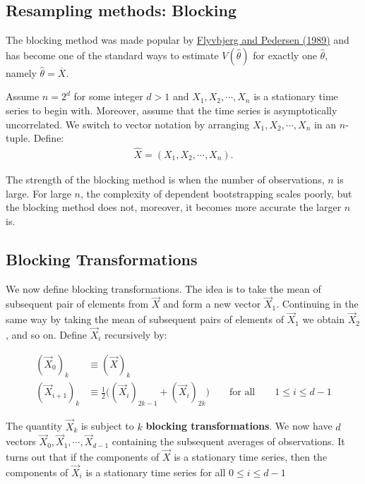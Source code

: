 \documentclass[%
oneside,                 %
final,                   %
10pt]{article}
\begin{document}
\subsection*{Resampling methods: Blocking}

The blocking method was made popular by \href{{https://aip.scitation.org/doi/10.1063/1.457480}}{Flyvbjerg and Pedersen (1989)}
and has become one of the standard ways to estimate
$V(\widehat{\theta})$ for exactly one $\widehat{\theta}$, namely
$\widehat{\theta} = \overline{X}$. 

Assume $n = 2^d$ for some integer $d>1$ and $X_1,X_2,\cdots, X_n$ is a stationary time series to begin with. 
Moreover, assume that the time series is asymptotically uncorrelated. We switch to vector notation by arranging $X_1,X_2,\cdots,X_n$ in an $n$-tuple. Define:
\begin{align*}
\hat{X} = (X_1,X_2,\cdots,X_n).
\end{align*}

The strength of the blocking method is when the number of
observations, $n$ is large. For large $n$, the complexity of dependent
bootstrapping scales poorly, but the blocking method does not,
moreover, it becomes more accurate the larger $n$ is.

\subsection*{Blocking Transformations}
 We now define
blocking transformations. The idea is to take the mean of subsequent
pair of elements from $\vec{X}$ and form a new vector
$\vec{X}_1$. Continuing in the same way by taking the mean of
subsequent pairs of elements of $\vec{X}_1$ we obtain $\vec{X}_2$, and
so on. 
Define $\vec{X}_i$ recursively by:

\begin{align} 
(\vec{X}_0)_k &\equiv (\vec{X})_k \nonumber \\
(\vec{X}_{i+1})_k &\equiv \frac{1}{2}\Big( (\vec{X}_i)_{2k-1} +
(\vec{X}_i)_{2k} \Big) \qquad \text{for all} \qquad 1 \leq i \leq d-1
\end{align} 

The quantity $\vec{X}_k$ is
subject to $k$ \textbf{blocking transformations}.  We now have $d$ vectors
$\vec{X}_0, \vec{X}_1,\cdots,\vec X_{d-1}$ containing the subsequent
averages of observations. It turns out that if the components of
$\vec{X}$ is a stationary time series, then the components of
$\vec{X}_i$ is a stationary time series for all $0 \leq i \leq d-1$
\end{document}
